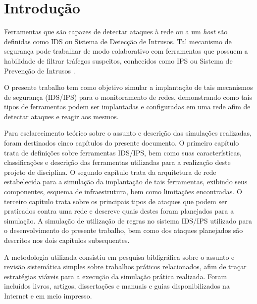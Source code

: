 \chapter[Introdução]{Introdução}
\label{chap:introducao}
	
		Ferramentas que são capazes de detectar ataques à rede ou a um \textit{host} são definidas como IDS ou Sistema de Detecção de Intrusos. Tal mecanismo de segurança pode trabalhar de modo colaborativo com ferramentas que possuem a habilidade de filtrar tráfegos suspeitos, conhecidos como IPS  ou Sistema de Prevenção de Intrusos \cite{Kurose}.
		
		O presente trabalho tem como objetivo simular a implantação de tais mecanismos de segurança (IDS/IPS) para o monitoramento de redes, demonstrando como tais tipos de ferramentas podem ser implantadas  e configuradas em uma rede afim de detectar ataques e reagir aos mesmos.
		
		Para esclarecimento teórico sobre o assunto e descrição das simulações realizadas, foram destinados cinco capítulos do presente documento. O primeiro capítulo trata de definições sobre ferramentas IDS/IPS, bem como suas características, classificações e descrição das ferramentas utilizadas para a realização deste projeto de disciplina. O segundo capítulo trata da arquitetura de rede estabelecida para a simulação da implantação de tais ferramentas, exibindo seus componentes, esquema de infraestrutura, bem como limitações encontradas. O terceiro capítulo trata sobre os principais tipos de ataques que podem ser praticados contra uma rede e descreve quais destes foram planejados para a simulação. A simulação de utilização de regras no sistema IDS/IPS utilizado para o desenvolvimento do presente trabalho, bem como dos ataques planejados são descritos nos dois capítulos subsequentes.
		
		A metodologia utilizada consistiu em pesquisa bibligráfica sobre o assunto e revisão sistemática simples sobre trabalhos práticos relacionados, afim de traçar estratégias viáveis para a execução da simulação prática realizada. Foram incluídos livros, artigos, dissertações e manuais e guias disponibilizados na Internet e em meio impresso.

